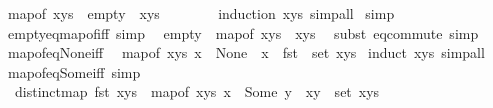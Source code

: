 \begin{isabellebody}
\ {\isachardoublequoteopen}map{\isacharunderscore}{\kern0pt}of\ xys\ {\isacharequal}{\kern0pt}\ empty\ {\isasymLongrightarrow}\ xys\ {\isacharequal}{\kern0pt}\ {\isacharbrackleft}{\kern0pt}{\isacharbrackright}{\kern0pt}{\isachardoublequoteclose}\isanewline
\ \ \ \ \isamarkupfalse%
\ {\isacharparenleft}{\kern0pt}induction\ xys{\isacharparenright}{\kern0pt}\ simp{\isacharunderscore}{\kern0pt}all\isanewline
{}\isamarkupfalse%
\ simp%
\endisatagproof
{\isafoldproof}%
%
\isadelimproof
\isanewline
%
\endisadelimproof
\isanewline
{}\isamarkupfalse%
\ empty{\isacharunderscore}{\kern0pt}eq{\isacharunderscore}{\kern0pt}map{\isacharunderscore}{\kern0pt}of{\isacharunderscore}{\kern0pt}iff\ {\isacharbrackleft}{\kern0pt}simp{\isacharbrackright}{\kern0pt}{\isacharcolon}{\kern0pt}\isanewline
\ \ {\isachardoublequoteopen}empty\ {\isacharequal}{\kern0pt}\ map{\isacharunderscore}{\kern0pt}of\ xys\ {\isasymlongleftrightarrow}\ xys\ {\isacharequal}{\kern0pt}\ {\isacharbrackleft}{\kern0pt}{\isacharbrackright}{\kern0pt}{\isachardoublequoteclose}\isanewline
%
\isadelimproof
%
\endisadelimproof
%
\isatagproof
{}\isamarkupfalse%
{\isacharparenleft}{\kern0pt}subst\ eq{\isacharunderscore}{\kern0pt}commute{\isacharparenright}{\kern0pt}\ simp%
\endisatagproof
{\isafoldproof}%
%
\isadelimproof
\isanewline
%
\endisadelimproof
\isanewline
{}\isamarkupfalse%
\ map{\isacharunderscore}{\kern0pt}of{\isacharunderscore}{\kern0pt}eq{\isacharunderscore}{\kern0pt}None{\isacharunderscore}{\kern0pt}iff{\isacharcolon}{\kern0pt}\isanewline
\ \ {\isachardoublequoteopen}{\isacharparenleft}{\kern0pt}map{\isacharunderscore}{\kern0pt}of\ xys\ x\ {\isacharequal}{\kern0pt}\ None{\isacharparenright}{\kern0pt}\ {\isacharequal}{\kern0pt}\ {\isacharparenleft}{\kern0pt}x\ {\isasymnotin}\ fst\ {\isacharbackquote}{\kern0pt}\ {\isacharparenleft}{\kern0pt}set\ xys{\isacharparenright}{\kern0pt}{\isacharparenright}{\kern0pt}{\isachardoublequoteclose}\isanewline
%
\isadelimproof
%
\endisadelimproof
%
\isatagproof
{}\isamarkupfalse%
\ {\isacharparenleft}{\kern0pt}induct\ xys{\isacharparenright}{\kern0pt}\ simp{\isacharunderscore}{\kern0pt}all%
\endisatagproof
{\isafoldproof}%
%
\isadelimproof
\isanewline
%
\endisadelimproof
\isanewline
{}\isamarkupfalse%
\ map{\isacharunderscore}{\kern0pt}of{\isacharunderscore}{\kern0pt}eq{\isacharunderscore}{\kern0pt}Some{\isacharunderscore}{\kern0pt}iff\ {\isacharbrackleft}{\kern0pt}simp{\isacharbrackright}{\kern0pt}{\isacharcolon}{\kern0pt}\isanewline
\ \ {\isachardoublequoteopen}distinct{\isacharparenleft}{\kern0pt}map\ fst\ xys{\isacharparenright}{\kern0pt}\ {\isasymLongrightarrow}\ {\isacharparenleft}{\kern0pt}map{\isacharunderscore}{\kern0pt}of\ xys\ x\ {\isacharequal}{\kern0pt}\ Some\ y{\isacharparenright}{\kern0pt}\ {\isacharequal}{\kern0pt}\ {\isacharparenleft}{\kern0pt}{\isacharparenleft}{\kern0pt}x{\isacharcomma}{\kern0pt}y{\isacharparenright}{\kern0pt}\ {\isasymin}\ set\ xys{\isacharparenright}{\kern0pt}{\isachardoublequoteclose}\isanewline

\end{isabellebody}
